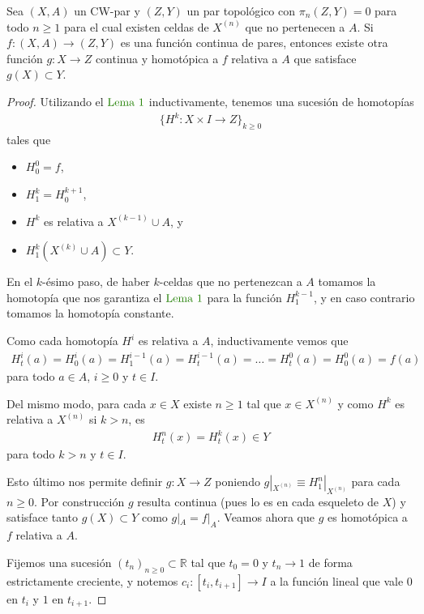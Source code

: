 \documentclass[11pt]{article}
\newcommand{\R}{\mathbb{R}}
\newcommand{\paint}[1]{\color{color}{#1}}
\newenvironment{lemma}[2][Lema]{\begin{trivlist}
\item[\hskip \labelsep \paint{{\bfseries #1}}\hskip \labelsep {\bfseries #2.}]}{\end{trivlist}}
\begin{document}
\begin{lemma}{2} Sea $(X,A)$ un CW-par y $(Z,Y)$ un par topológico con $\pi_n(Z,Y) = 0$ para todo $n \geq 1$ para el cual existen celdas de $X^{(n)}$ que no pertenecen a $A$. Si $f : (X,A) \to (Z,Y)$ es una función continua de pares, entonces existe otra función $g : X \to Z$ continua y homotópica a $f$ relativa a $A$ que satisface $g(X) \subset Y$.
\end{lemma}
\begin{proof} Utilizando el $\paint{\text{Lema $1$}}$ inductivamente, tenemos una sucesión de homotopías
\begin{align*}
\{H^k : X \times I \to Z\}_{k \geq 0}
\end{align*}
tales que 
\begin{itemize}
\item $H^0_0 = f$,
\item $H^k_1 = H^{k+1}_0$,
\item $H^k$ es relativa a $X^{(k-1)} \cup A$, y
\item $H^k_1(X^{(k)} \cup A) \subset Y$.
\end{itemize}
En el $k$-ésimo paso, de haber $k$-celdas que no pertenezcan a $A$ tomamos la homotopía que nos garantiza el $\paint{\text{Lema $1$}}$ para la función $H^{k-1}_1$, y en caso contrario tomamos la homotopía constante.

Como cada homotopía $H^i$ es relativa a $A$, inductivamente vemos que
\begin{align*}
H^i_t(a) = H^i_0(a) = H^{i-1}_1(a) = H^{i-1}_t(a) = \dots = H^0_t(a) = H^0_0(a) = f(a)
\end{align*}
para todo $a \in A$, $i \geq 0$ y $t \in I$.

Del mismo modo, para cada $x \in X$  existe $n \geq 1$ tal que $x \in X^{(n)}$ y como $H^k$ es relativa a $X^{(n)}$ si $k > n$, es
\begin{align*}
H^n_t(x) = H^k_t(x) \in Y
\end{align*}
para todo $k > n$ y $t\in I$. 

Esto último nos permite definir $g : X \to Z$ poniendo $g|_{X^{(n)}} \equiv H^n_1|_{X^{(n)}}$ para cada $n \geq 0$. Por construcción $g$ resulta continua (pues lo es en cada esqueleto de $X$) y satisface tanto $g(X) \subset Y$ como $g|_A = f|_A$. Veamos ahora que $g$ es homotópica a $f$ relativa a $A$.

Fijemos una sucesión $(t_n)_{n \geq 0} \subset \R$ tal que $t_0 = 0$ y $t_n \to 1$ de forma estrictamente creciente, y notemos $c_i : [t_i,t_{i+1}] \to I$ a la función lineal que vale $0$ en $t_i$ y $1$ en $t_{i+1}$. 


\end{proof}
\end{document}
